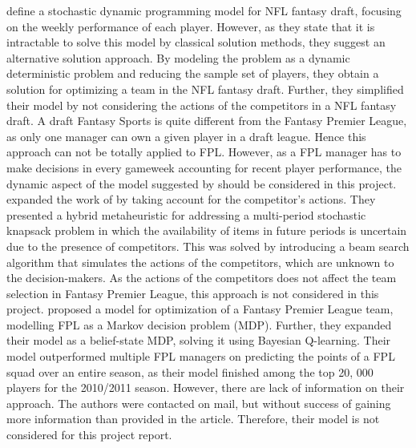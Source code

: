 \cite{Fry} define a stochastic dynamic programming model for NFL fantasy  draft, focusing on the weekly performance of each player. However, as they state that it is intractable to solve this model by classical solution methods, they suggest an alternative solution approach. By modeling the problem as a dynamic deterministic problem and reducing the sample set of players, they obtain a solution for optimizing a team in the NFL fantasy draft. Further, they simplified their model by not considering the actions of the competitors in a NFL fantasy draft. A draft Fantasy Sports is quite different from the Fantasy Premier League, as only one manager can own a given player in a draft league. Hence this approach can not be totally applied to FPL. However, as a FPL manager has to make decisions in every gameweek accounting for recent player performance, the dynamic aspect of the model suggested by \cite{Fry} should be considered in this project. 
\newpar
\cite{Gibson} expanded the work of \cite{Fry} by taking account for the competitor's actions. They presented a hybrid metaheuristic for addressing a multi-period stochastic knapsack problem in which the availability of items in future periods is uncertain due to the presence of competitors. This was solved by introducing a beam search algorithm that simulates the actions of the competitors, which are unknown to the decision-makers. As the actions of the competitors does not affect the team selection in Fantasy Premier League, this approach is not considered in this project. 
\newpar
\cite{Matthews} proposed a model for optimization of a Fantasy Premier League team, modelling FPL as a Markov decision problem (MDP). Further, they expanded their model as a belief-state MDP, solving it using Bayesian Q-learning. Their model outperformed multiple FPL managers on predicting the points of a FPL squad over an entire season, as their model finished among the top 20, 000 players for the 2010/2011 season. However, there are lack of information on their approach. The authors were contacted on mail, but without success of gaining more information than provided in the article. Therefore, their model is not considered for this project report. 

\begin{comment}
There is limited research available on optimization of a Fantasy Premier League team. However, due to the large amount of active NFL Fantasy Sports players, literature is available for both season- and weekly format. \cite{King} suggested a model for predicting points for the quarterbacks in the NFL, using Backward Stepwise regression and Support Vector regression models in his research. Further, he predicted fantasy points by use of Artificial Neural Networks. Similar approaches can be used in order to predict the performance of the Premier League players.
\end{comment}



